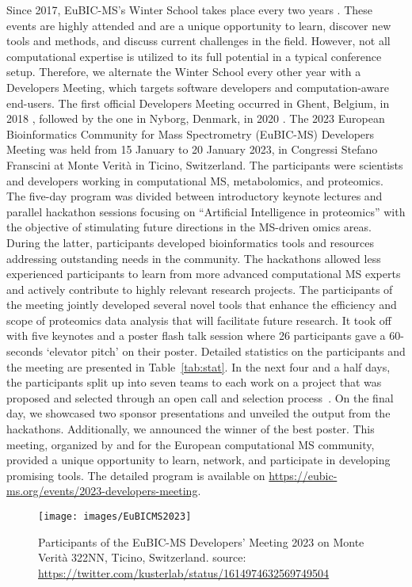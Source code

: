 Since 2017, EuBIC-MS's Winter School takes place every two years \citep{pmid28385664}. These events are highly attended and are a unique opportunity to learn, discover new tools and methods, and discuss current challenges in the field. However, not all computational expertise is utilized to its full potential in a typical conference setup. Therefore, we alternate the Winter School every other year with a Developers Meeting, which targets software developers and computation-aware end-users. The first official Developers Meeting occurred in Ghent, Belgium, in 2018 \citep{pmid29864591}, followed by the one in Nyborg, Denmark, in 2020 \citep{EuBIC-MS2020}.
The 2023 European Bioinformatics Community for Mass Spectrometry (EuBIC-MS) Developers Meeting was held from 15 January to 20 January 2023, in Congressi Stefano Franscini at Monte Verità in Ticino, Switzerland. The participants were scientists and developers working in computational MS, metabolomics, and proteomics. The five-day program was divided between introductory keynote lectures and parallel hackathon sessions focusing on ``Artificial Intelligence in proteomics'' with the objective of stimulating future directions in the MS-driven omics areas. During the latter, participants developed bioinformatics tools and resources addressing outstanding needs in the community. The hackathons allowed less experienced participants to learn from more advanced computational MS experts and actively contribute to highly relevant research projects. The participants of the meeting jointly developed several novel tools that enhance the efficiency and scope of proteomics data analysis that will facilitate future research.
It took off with five keynotes and a poster flash talk session where 26 participants gave a 60-seconds `elevator pitch' on their poster. Detailed statistics on the participants and the meeting are presented in Table~\ref{tab:stat}. In the next four and a half days, the participants split up into seven teams to each work on a project that was proposed and selected through an open call and selection process~\citep{EuBIC2023GitHub}. On the final day, we showcased two sponsor presentations and unveiled the output from the hackathons. Additionally, we announced the winner of the best poster. This meeting, organized by and for the European computational MS community, provided a unique opportunity to learn, network, and participate in developing promising tools. The detailed program is available on \url{https://eubic-ms.org/events/2023-developers-meeting}.

\begin{figure*}[ht]
\centering
\texttt{[image: images/EuBICMS2023]}
\caption{Participants of the EuBIC-MS Developers’ Meeting 2023 on Monte Verità 322NN, Ticino, Switzerland. source: \url{https://twitter.com/kusterlab/status/1614974632569749504}}
\end{figure*}

